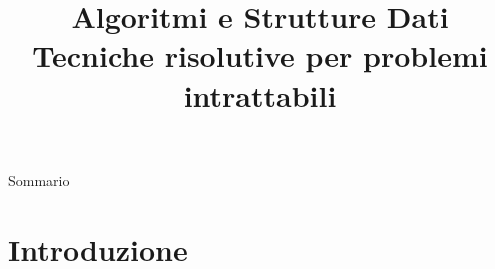 
\title[ASD - Approssimazione]{\textbf{Algoritmi e Strutture Dati}\\[24pt]Tecniche risolutive per problemi intrattabili}

\usepackage{epigraph}
\usepackage{xcolor}
\usepackage{colortbl}
\usepackage{pdfpages}

\newcommand{\PTIME}{\mbox{\sc $\mathbb{P}$}}
\renewcommand{\NP}{\mbox{$\mathbb{NP}$}}
\newcommand{\TIME}{\mbox{$\mathbb{TIME}$}}
\newcommand{\EXPTIME}{\mbox{$\mathbb{EXPTIME}$}}
\newcommand{\SPACE}{\mbox{$\mathbb{SPACE}$}}
\newcommand{\PSPACE}{\mbox{$\mathbb{PSPACE}$}}

\newcommand{\R}[1]{\textcolor{red}{#1}}
\newcommand{\B}[1]{\textcolor{blue}{#1}}

\newcommand{\Missing}{\mathit{missing}}
\newcommand{\DP}{\mathit{DP}}
\newcommand{\Cost}{\mathit{cost}}
\newcommand{\Transfer}{\mathit{transfer}}



\renewcommand{\arraystretch}{1.4}
\graphicspath{{figs/19/}}
\renewcommand{\enumerazione}{\fontproc{enumeration}}
\newcommand{\isAdmissible}{\fontproc{isAdmissible}}
\newcommand{\isImpossible}{\fontproc{reject}}



\FrameTitle{}

\begin{PlainFrame}{Sommario}
\end{PlainFrame}



\section{Introduzione}


